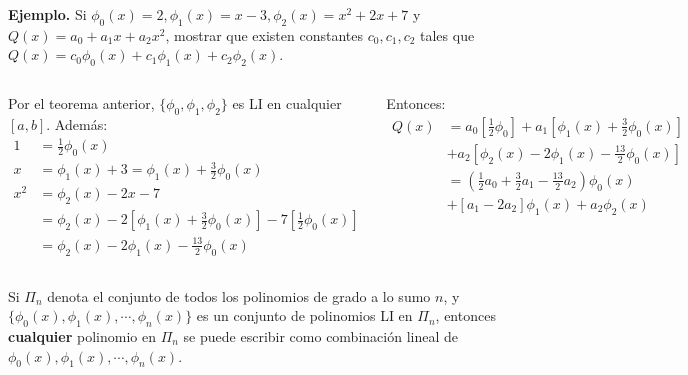 \documentclass[9pt, aspectratio=169]{beamer}
\begin{document}
\begin{frame}
    \textbf{Ejemplo.} Si $\phi_0(x) = 2, \phi_1(x) = x-3, \phi_2(x) = x^2 + 2x+7$ y $Q(x) = a_0 + a_1 x + a_2 x^2$, mostrar que existen constantes $c_0, c_1, c_2$ tales que $Q(x) = c_0 \phi_0(x) + c_1 \phi_1(x) + c_2 \phi_2(x)$.
\vspace{1em} \pause

\begin{columns}[t]
\cx
Por el teorema anterior, $\{\phi_0, \phi_1, \phi_2 \}$ es LI en cualquier $[a, b]$. Además:
\begin{align*}
1 &= \frac{1}{2}\phi_0(x) \\
x &= \phi_1(x) + 3 = \phi_1(x) + \frac{3}{2} \phi_0(x) \\
    x^2 &= \phi_2(x) - 2 x - 7 \\ 
        &= \phi_2(x) - 2 \left[ \phi_1(x) + \frac{3}{2} \phi_0(x) \right] - 7 \left[ \frac{1}{2} \phi_0(x) \right] \\
        &= \phi_2(x) -2 \phi_1(x) - \frac{13}{2} \phi_0(x)
\end{align*} \pause

\cx
Entonces:
\begin{align*}
    Q(x) &= a_0 \left[ \frac{1}{2} \phi_0 \right] + a_1 \left[ \phi_1(x) + \frac{3}{2} \phi_0(x)  \right] \\
         &+ a_2 \left[ \phi_2(x) - 2\phi_1(x) - \frac{13}{2} \phi_0(x) \right] \\
         &= \left( \frac{1}{2} a_0 + \frac{3}{2} a_1 - \frac{13}{2} a_2 \right) \phi_0(x)\\
         &+ [a_1 - 2 a_2] \phi_1(x) + a_2 \phi_2(x)
\end{align*}
\end{columns} \pause

\begin{theorem}[]
    Si $\Pi_n$ denota el conjunto de todos los polinomios de grado a lo sumo $n$, y $\{\phi_0(x), \phi_1(x), \cdots, \phi_n(x) \}$ es un conjunto de polinomios LI en $\Pi_n$, entonces \textbf{cualquier} polinomio en $\Pi_n$ se puede escribir como combinación lineal de $\phi_0(x), \phi_1(x), \cdots, \phi_n(x)$.
\end{theorem}

\end{frame}
\end{document}
